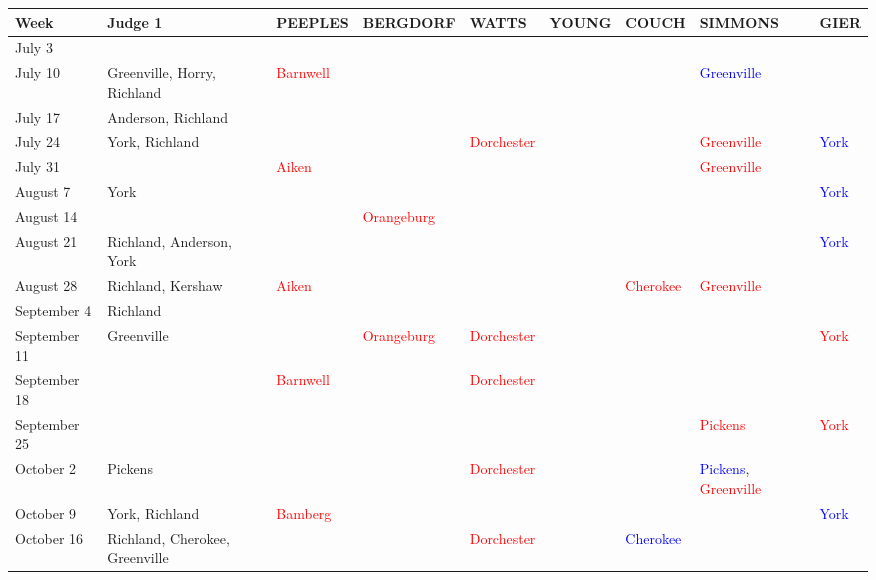 \documentclass[11pt, oneside]{article}   	%
\newcommand{\rowgroup}[1]{\hspace{-1em}#1}
\theoremstyle{ModifiedStyle}
\begin{document}
\begin{table}[H]
	\centering
	\vspace{-5mm}
	\hspace*{-15mm}
	\setlength\tabcolsep{0pt} %
	{\scriptsize
		\begin{tabular}{L{23mm}C{55mm}C{16mm}C{20mm}C{16mm}C{15mm}C{15mm}C{26mm}C{8mm}}
			\toprule 
			\rule{0pt}{2.3ex} Week & Judge 1 & PEEPLES & BERGDORF & WATTS & YOUNG & COUCH & SIMMONS & GIER \\
			\midrule
			July 3 & & & & & & & &\\
			July 10 &  Greenville, Horry, Richland & \textcolor{red}{Barnwell} & & & & &  \textcolor{blue}{Greenville} &\\
			July 17 &  Anderson, Richland & & & & & & &\\
			July 24 &  York, Richland & & &  \textcolor{red}{Dorchester} & & &  \textcolor{red}{Greenville} &  \textcolor{blue}{York} \\
			July 31 & & \textcolor{red}{Aiken} & & & & &  \textcolor{red}{Greenville} &\\
			August 7 &  York & & & & & & &  \textcolor{blue}{York} \\
			August 14 & & & \textcolor{red}{Orangeburg} & & & & &\\
			August 21 &  Richland, Anderson, York & & & & & & &  \textcolor{blue}{York} \\
			August 28 &  Richland, Kershaw & \textcolor{red}{Aiken} & & & &  \textcolor{red}{Cherokee} &  \textcolor{red}{Greenville} &\\
			September 4 &  Richland & & & & & & &\\
			September 11 &  Greenville & & \textcolor{red}{Orangeburg} &  \textcolor{red}{Dorchester} & & & &  \textcolor{red}{York} \\
			September 18 & & \textcolor{red}{Barnwell} & &  \textcolor{red}{Dorchester} & & & &\\
			September 25 & & & & & & &  \textcolor{red}{Pickens} &  \textcolor{red}{York} \\
			October 2 &  Pickens & & &  \textcolor{red}{Dorchester} & & &  \textcolor{blue}{Pickens}, \textcolor{red}{Greenville} &\\
			October 9 &  York, Richland & \textcolor{red}{Bamberg} & & & & & &  \textcolor{blue}{York} \\
			October 16 &  Richland, Cherokee, Greenville & & &  \textcolor{red}{Dorchester} & &  \textcolor{blue}{Cherokee} & &\\

\end{tabular}}
\end{table}
\end{document}
